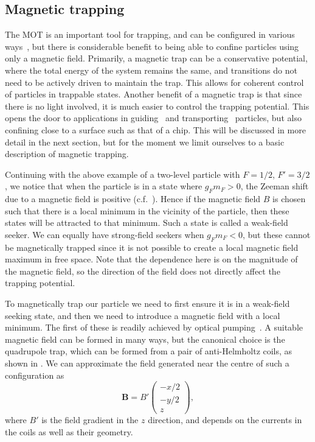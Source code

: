 \subsection{Magnetic trapping}
\label{theory:magtraps}

The MOT is an important tool for trapping, and can be configured in various
ways~\cite{Cotter2016, Lee:96, PhysRevLett.59.2631}, but there is considerable
benefit to being able to confine particles using only a magnetic field.
%
Primarily, a magnetic trap can be a conservative potential, where the total
energy of the system remains the same, and transitions do not need to be
actively driven to maintain the trap. This allows for coherent control of
particles in trappable states.
%
Another benefit of a magnetic trap is that since there is no light involved, it
is much easier to control the trapping potential. This opens the door to
applications in guiding~\cite{PhysRevLett.83.5194} and
transporting~\cite{Nakagawa2005} particles, but also confining close to a
surface such as that of a chip. This will be discussed in more detail in the
next section, but for the moment we limit ourselves to a basic description of
magnetic trapping.

Continuing with the above example of a two-level particle with $F=1/2$,
$F'=3/2$, we notice that when the particle is in a state where $g_F m_F > 0$,
the Zeeman shift due to a magnetic field is positive (c.f.\
). Hence if the magnetic field $B$ is chosen such
that there is a local minimum in the vicinity of the particle, then these
states will be attracted to that minimum. Such a state is called a weak-field
seeker. We can equally have strong-field seekers when $g_F m_F < 0$, but these
cannot be magnetically trapped since it is not possible to create a local
magnetic field maximum in free space.
%
Note that the dependence here is on the magnitude of the magnetic field, so the
direction of the field does not directly affect the trapping potential.

To magnetically trap our particle we need to first ensure it is in a weak-field
seeking state, and then we need to introduce a magnetic field with a local
minimum. The first of these is readily achieved by optical
pumping~\cite{PhysRevLett.54.2596}.  A suitable magnetic field can be formed in
many ways, but the canonical choice is the quadrupole trap, which can be formed
from a pair of anti-Helmholtz coils, as shown in
. We can approximate the field generated near
the centre of such a configuration as~\cite{Metcalf1999}
%
\begin{equation}
  \mathbf{B} = B'\begin{pmatrix} -x/2 \\ -y/2 \\ z \end{pmatrix},
  \label{theory:eqn:quadrupole}
\end{equation}
%
where $B'$ is the field gradient in the $z$ direction, and depends on the
currents in the coils as well as their geometry.

